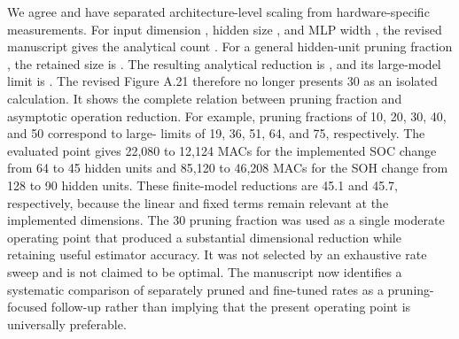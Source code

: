 {} We agree and have separated architecture-level scaling from hardware-specific measurements. For input dimension , hidden size , and MLP width , the revised manuscript gives the analytical count\markdownRendererParagraphSeparator
{}.\markdownRendererParagraphSeparator
{}For a general hidden-unit pruning fraction , the retained size is . The resulting analytical reduction is\markdownRendererParagraphSeparator
{},\markdownRendererParagraphSeparator
{}and its large-model limit is . The revised Figure A.21 therefore no longer presents 30\markdownRendererPercentSign{} as an isolated calculation. It shows the complete relation between pruning fraction and asymptotic operation reduction. For example, pruning fractions of 10\markdownRendererPercentSign{}, 20\markdownRendererPercentSign{}, 30\markdownRendererPercentSign{}, 40\markdownRendererPercentSign{}, and 50\markdownRendererPercentSign{} correspond to large- limits of 19\markdownRendererPercentSign{}, 36\markdownRendererPercentSign{}, 51\markdownRendererPercentSign{}, 64\markdownRendererPercentSign{}, and 75\markdownRendererPercentSign{}, respectively.\markdownRendererParagraphSeparator
{}The evaluated  point gives 22,080 to 12,124 MACs for the implemented SOC change from 64 to 45 hidden units and 85,120 to 46,208 MACs for the SOH change from 128 to 90 hidden units. These finite-model reductions are 45.1\markdownRendererPercentSign{} and 45.7\markdownRendererPercentSign{}, respectively, because the linear and fixed terms remain relevant at the implemented dimensions. The 30\markdownRendererPercentSign{} pruning fraction was used as a single moderate operating point that produced a substantial dimensional reduction while retaining useful estimator accuracy. It was not selected by an exhaustive rate sweep and is not claimed to be optimal. The manuscript now identifies a systematic comparison of separately pruned and fine-tuned rates as a pruning-focused follow-up rather than implying that the present operating point is universally preferable.\markdownRendererParagraphSeparator
